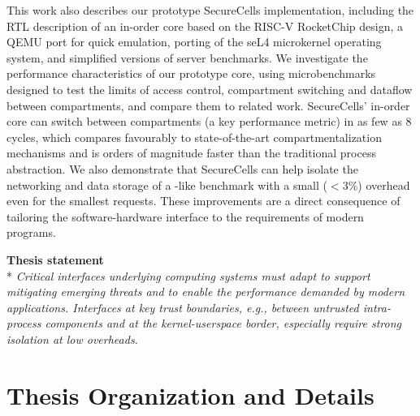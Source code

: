 This work also describes our prototype SecureCells implementation, including
the RTL description of an in-order core based on the RISC-V RocketChip design,
a QEMU port for quick emulation, porting of the seL4 microkernel operating
system, and simplified versions of server benchmarks.
We investigate the performance characteristics of our prototype core, using
microbenchmarks designed to test the limits of access control, compartment 
switching and dataflow between compartments, and compare them to related work.
SecureCells' in-order core can switch between compartments (a key performance
metric) in as few as 8 cycles, which compares favourably to state-of-the-art
compartmentalization mechanisms and is orders of magnitude faster than the
traditional process abstraction.
We also demonstrate that SecureCells can help isolate the networking and
data storage of a -like benchmark with a small ($<3\%$)
overhead even for the smallest requests.
These improvements are a direct consequence of tailoring the software-hardware
interface to the requirements of modern programs.

\begin{center}
      \textbf{Thesis statement}\\*
\emph{
      Critical interfaces underlying computing systems must adapt 
      to support mitigating emerging threats and 
      to enable the performance demanded by modern applications.
      Interfaces at key trust boundaries, e.g.,
      between untrusted intra-process components and 
      at the kernel-userspace border, 
      especially require strong isolation at low overheads.
}
\end{center}


\section{Thesis Organization and Details}

